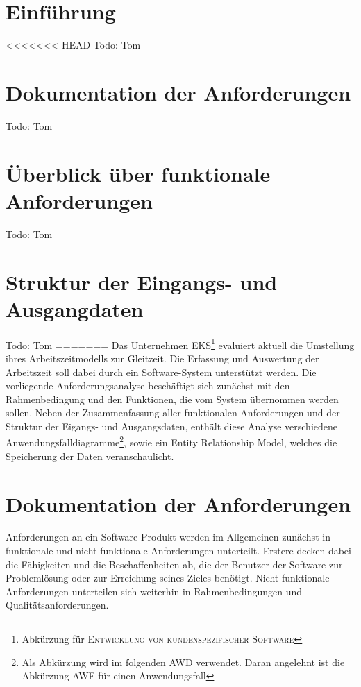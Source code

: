 \mainmatter

\chapter{Einführung}
<<<<<<< HEAD
Todo: Tom
\chapter{Dokumentation der Anforderungen}
Todo: Tom
\chapter{Überblick über funktionale Anforderungen}
Todo: Tom
\chapter{Struktur der Eingangs- und Ausgangdaten}
Todo: Tom
=======
Das Unternehmen \textsc{EKS}\footnote{Abkürzung für \textsc{Entwicklung von kundenspezifischer Software}} evaluiert aktuell die Umstellung ihres Arbeitszeitmodells zur Gleitzeit. Die Erfassung und Auswertung der Arbeitszeit soll dabei durch ein Software-System unterstützt werden. Die vorliegende Anforderungsanalyse beschäftigt sich zunächst mit den Rahmenbedingung und den Funktionen, die vom System übernommen werden sollen. Neben der Zusammenfassung aller funktionalen Anforderungen und der Struktur der Eigangs- und Ausgangsdaten, enthält diese Analyse verschiedene Anwendungsfalldiagramme\footnote{Als Abk\"urzung wird im folgenden \textsc{AWD} verwendet. Daran angelehnt ist die Abk\"urzung \textsc{AWF} f\"ur einen Anwendungsfall}, sowie ein Entity Relationship Model, welches die Speicherung der Daten veranschaulicht.

\chapter{Dokumentation der Anforderungen}
Anforderungen an ein Software-Produkt werden im Allgemeinen zunächst in funktionale und nicht-funktionale Anforderungen unterteilt. Erstere decken dabei die Fähigkeiten und die Beschaffenheiten ab, die der Benutzer der Software zur Problemlösung oder zur Erreichung seines Zieles benötigt. Nicht-funktionale Anforderungen unterteilen sich weiterhin in Rahmenbedingungen und Qualitätsanforderungen.

